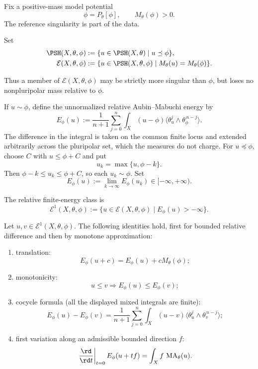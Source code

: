 Fix a positive-mass model potential
\[
                         \phi=P_\theta[\phi],
             \qquad M_\theta(\phi)>0.
\]
The reference singularity is part of the data.

\begin{definition}
\label{def:appH-relative-full-mass}
Set
\[
\begin{aligned}
 \PSH(X,\theta,\phi)
 &:=\{u\in\PSH(X,\theta)\mid u\preceq\phi\},\\
 \mathcal E(X,\theta,\phi)
 &:=\{u\in\PSH(X,\theta,\phi)\mid
                   M_\theta(u)=M_\theta(\phi)\}.
\end{aligned}
\]
\end{definition}

Thus a member of \(\mathcal E(X,\theta,\phi)\) may be strictly more
singular than \(\phi\), but loses no nonpluripolar mass relative to
\(\phi\).

If \(u\sim\phi\), define the unnormalized relative Aubin--Mabuchi
energy by
\[
 E_\phi(u)
 :=\frac1{n+1}\sum_{j=0}^n
   \int_X (u-\phi)
   \langle\theta_u^j\wedge\theta_\phi^{\,n-j}\rangle.
\]
The difference in the integral is taken on the common finite locus and
extended arbitrarily across the pluripolar set, which the measures do not
charge.  For \(u\preceq\phi\), choose \(C\) with \(u\leq\phi+C\) and put
\[
                         u_k=\max\{u,\phi-k\}.
\]
Then \(\phi-k\leq u_k\leq\phi+C\), so each \(u_k\sim\phi\).  Set
\[
                         E_\phi(u)
 :=\lim_{k\to\infty}E_\phi(u_k)\in[-\infty,+\infty).
\]

\begin{definition}
\label{def:appH-e1}
The relative finite-energy class is
\[
 \mathcal E^1(X,\theta,\phi)
 :=\{u\in\mathcal E(X,\theta,\phi)\mid E_\phi(u)>-\infty\}.
\]
\end{definition}

\begin{proposition}\label{prop:appH-energy-formulas}
Let \(u,v\in\mathcal E^1(X,\theta,\phi)\). The following identities hold,
first for bounded relative difference and then by monotone approximation:
\begin{enumerate}
\item translation:
\[
                         E_\phi(u+c)
                         =E_\phi(u)+cM_\theta(\phi);
\]
\item monotonicity:
\[
                         u\leq v\Longrightarrow
                         E_\phi(u)\leq E_\phi(v);
\]
\item cocycle formula (all the displayed mixed integrals are finite):
\[
 E_\phi(u)-E_\phi(v)
 =\frac1{n+1}\sum_{j=0}^n
   \int_X(u-v)
   \langle\theta_u^j\wedge\theta_v^{\,n-j}\rangle;
\]
\item first variation along an admissible bounded direction \(f\):
\[
 \left.\frac{\rd}{\rd t}\right|_{t=0}E_\phi(u+tf)
 =\int_X f\,\operatorname{MA}_\theta(u).
\]
\end{enumerate}
\end{proposition}

